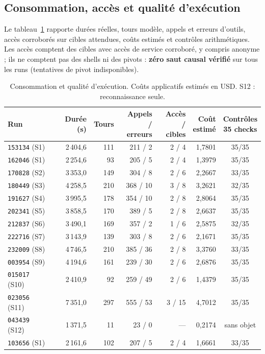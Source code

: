\documentclass[11pt,a4paper]{article}
\newcommand{\code}[1]{{\urlstyle{tt}\nolinkurl{#1}}}
\begin{document}
\subsection{Consommation, acc\`es et qualit\'e d'ex\'ecution}
Le tableau~\ref{tab:conso} rapporte dur\'ees r\'eelles, tours mod\`ele, appels et erreurs d'outils, acc\`es corrobor\'es sur cibles attendues, co\^uts estim\'es et contr\^oles arithm\'etiques. Les accès comptent des cibles avec accès de service corroboré, y compris anonyme ; ils ne comptent pas des shells ni des pivots : \textbf{z\'ero saut causal v\'erifi\'e} sur tous les runs (tentatives de pivot indisponibles).
\begin{table}[H]
\centering
\small
\caption{Consommation et qualit\'e d'ex\'ecution. Co\^uts applicatifs estim\'es en USD. S12 : reconnaissance seule.}
\label{tab:conso}
\setlength{\tabcolsep}{4pt}
\begin{tabular}{lrrrrrc}
\toprule
Run & Dur\'ee (s) & Tours & \shortstack{Appels /\\erreurs} & \shortstack{Acc\`es /\\cibles} & \shortstack{Co\^ut\\estim\'e} & \shortstack{Contr\^oles\\35 checks}\\
\midrule
\code{153134} (S1) & 2\,404,6 & 111 & 211 / 2 & 2 / 4 & 1,7801 & 35/35\\
\code{162046} (S1) & 2\,254,6 & 93 & 205 / 5 & 2 / 4 & 1,3979 & 35/35\\
\code{170828} (S2) & 3\,353,0 & 149 & 304 / 8 & 2 / 6 & 2,2667 & 33/35\\
\code{180449} (S3) & 4\,258,5 & 210 & 368 / 10 & 3 / 8 & 3,2621 & 32/35\\
\code{191627} (S4) & 3\,995,5 & 178 & 354 / 10 & 2 / 8 & 2,8064 & 35/35\\
\code{202341} (S5) & 3\,858,5 & 170 & 389 / 5 & 2 / 8 & 2,6637 & 35/35\\
\code{212837} (S6) & 3\,490,1 & 169 & 357 / 2 & 1 / 6 & 2,5875 & 32/35\\
\code{222716} (S7) & 3\,143,9 & 139 & 303 / 8 & 2 / 6 & 2,1671 & 35/35\\
\code{232009} (S8) & 4\,746,5 & 210 & 385 / 36 & 2 / 8 & 3,3760 & 33/35\\
\code{003954} (S9) & 4\,194,6 & 161 & 239 / 30 & 2 / 6 & 2,6876 & 35/35\\
\code{015017} (S10) & 2\,410,9 & 92 & 259 / 49 & 2 / 6 & 1,4379 & 35/35\\
\code{023056} (S11) & 7\,351,0 & 297 & 555 / 53 & 3 / 15 & 4,7012 & 35/35\\
\code{043439} (S12) & 1\,371,5 & 11 & 23 / 0 & --- & 0,2174 & sans objet\\
\code{103656} (S1) & 2\,161,6 & 102 & 207 / 5 & 2 / 4 & 1,6661 & 33/35\\
\bottomrule
\end{tabular}
\end{table}
\end{document}
